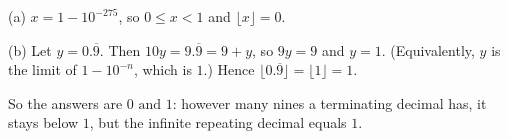 (a) $x=1-10^{-275}$, so $0\le x<1$ and $\lfloor x\rfloor=0$.

(b) Let $y=0.\overline{9}$. Then $10y=9.\overline{9}=9+y$, so $9y=9$ and $y=1$. (Equivalently, $y$ is the limit of $1-10^{-n}$, which is $1$.) Hence $\lfloor0.\overline9\rfloor=\lfloor1\rfloor=1$.

So the answers are $\boxed{0\text{ and }1}$: however many nines a terminating decimal has, it stays below $1$, but the infinite repeating decimal equals $1$.
